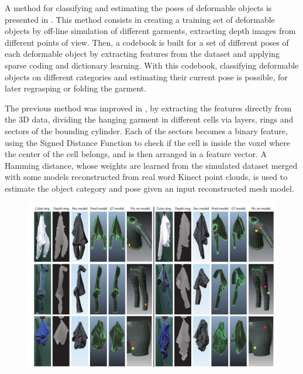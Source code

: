 A method for classifying and estimating the poses of deformable objects is presented in \cite{Li2014ICRA}. This method consists in creating a training set of deformable objects by off-line simulation of different garments, extracting depth images from different points of view. Then, a codebook is built for a set of different poses of each deformable object by extracting features from the dataset and applying sparse coding and dictionary learning. With this codebook, classifying deformable objects on different categories and estimating their current pose is possible, for later regrasping or folding the garment.

The previous method was improved in \cite{Li2014IROS}, by extracting the features directly from the 3D data, dividing the hanging garment in different cells via layers, rings and sectors of the bounding cylinder. Each of the sectors becomes a binary feature, using the Signed Distance Function to check if the cell is inside the voxel where the center of the cell belongs, and is then arranged in a feature vector. A Hamming distance, whose weights are learned from the simulated dataset merged with some models reconstructed from real word Kinect point clouds, is used to estimate the object category and pose given an input reconstructed mesh model.

\begin{figure}[thpb]
    \centering
    \includegraphics[width=\textwidth]{figures/SOTA_Li_2014-2.png}
    \caption{
    }
    \label{fig:SOTA_Li_2014}
\end{figure}

